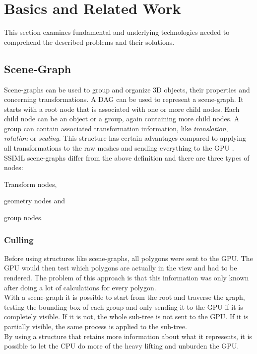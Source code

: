 
\section{Basics and Related Work}
\label{basics-and-related-work}


This section examines fundamental and underlying technologies needed to comprehend the described problems and their solutions.

\subsection{Scene-Graph}\label{scene-graph}

Scene-graphs can be used to group and organize \gls{3D} objects, their properties and
concerning transformations. A \gls{DAG} can be used to represent a scene-graph.
It starts with a root node that is associated with one or more child nodes. Each
child node can be an object or a group, again containing more child nodes. A group can
contain associated transformation information, like \emph{translation},
\emph{rotation} or \emph{scaling}. This structure has certain advantages
compared to applying all transformations to the raw meshes and sending
everything to the \gls{GPU} \cite{realityprime}. \gls{SSIML} scene-graphs differ from the
above definition and there are three types of nodes:

\begin{itemize*}
  \item Transform nodes,
  \item geometry nodes and
  \item group nodes.
\end{itemize*}

\subsubsection{Culling}\label{culling}

Before using structures like scene-graphs, all polygons were sent to
the \gls{GPU}. The \gls{GPU} would then test which polygons are actually in the
view and had to be rendered. The problem of this approach is
that this information was only known after doing a lot of calculations
for every polygon.\\
With a scene-graph it is possible to start from the root and traverse the
graph, testing the bounding box of each group and only sending it to the
\gls{GPU} if it is completely visible. If it is not, the whole sub-tree is not
sent to the \gls{GPU}. If it is partially visible, the same process is applied
to the sub-tree.\\
By using a structure that retains more information about what it
represents, it is possible to let the CPU do more of the heavy
lifting and unburden the \gls{GPU}.

